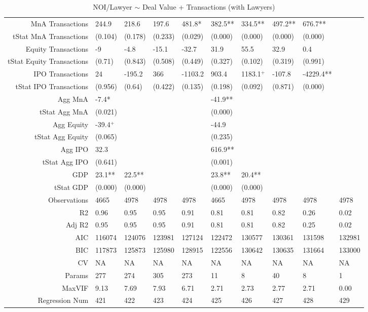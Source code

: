 \begin{table}[ht]
\begin{tabular}{rlllllllll}
  MnA Transactions & 244.9 & 218.6 & 197.6 & 481.8* & 382.5** & 334.5** & 497.2** & 676.7** &  \\ 
  tStat MnA Transactions & (0.104) & (0.178) & (0.233) & (0.029) & (0.000) & (0.000) & (0.000) & (0.000) &  \\ 
  Equity Transactions & -9 & -4.8 & -15.1 & -32.7 & 31.9 & 55.5 & 32.9 & 0.4 &  \\ 
  tStat Equity Transactions & (0.71) & (0.843) & (0.508) & (0.449) & (0.327) & (0.102) & (0.319) & (0.991) &  \\ 
  IPO Transactions & 24 & -195.2 & 366 & -1103.2 & 903.4 & 1183.1$^{+}$ & -107.8 & -4229.4** &  \\ 
  tStat IPO Transactions & (0.956) & (0.64) & (0.422) & (0.135) & (0.198) & (0.092) & (0.871) & (0.000) &  \\ 
  Agg MnA & -7.4* &  &  &  & -41.9** &  &  &  &  \\ 
  tStat Agg MnA & (0.021) &  &  &  & (0.000) &  &  &  &  \\ 
  Agg Equity & -39.4$^{+}$ &  &  &  & -44.9 &  &  &  &  \\ 
  tStat Agg Equity & (0.065) &  &  &  & (0.235) &  &  &  &  \\ 
  Agg IPO & 32.3 &  &  &  & 616.9** &  &  &  &  \\ 
  tStat Agg IPO & (0.641) &  &  &  & (0.001) &  &  &  &  \\ 
  GDP & 23.1** & 22.5** &  &  & 23.8** & 20.4** &  &  &  \\ 
  tStat GDP & (0.000) & (0.000) &  &  & (0.000) & (0.000) &  &  &  \\ 
  Observations & 4665 & 4978 & 4978 & 4978 & 4665 & 4978 & 4978 & 4978 & 4978 \\ 
  R2 & 0.96 & 0.95 & 0.95 & 0.91 & 0.81 & 0.81 & 0.82 & 0.26 & 0.02 \\ 
  Adj R2 & 0.95 & 0.95 & 0.95 & 0.91 & 0.81 & 0.81 & 0.82 & 0.25 & 0.02 \\ 
  AIC & 116074 & 124076 & 123981 & 127124 & 122472 & 130577 & 130361 & 131598 & 132981 \\ 
  BIC & 117873 & 125873 & 125980 & 128915 & 122556 & 130642 & 130635 & 131664 & 133000 \\ 
  CV & NA & NA & NA & NA & NA & NA & NA & NA & NA \\ 
  Params & 277 & 274 & 305 & 273 & 11 & 8 & 40 & 8 & 1 \\ 
  MaxVIF & 9.13 & 7.69 & 7.93 & 6.71 & 2.71 & 2.73 & 2.77 & 2.71 & 0.00 \\ 
  Regression Num & 421 & 422 & 423 & 424 & 425 & 426 & 427 & 428 & 429 \\ 
   \hline
\end{tabular}
\caption{NOI/Lawyer $\sim$ Deal Value + Transactions (with Lawyers)} 
\end{table}
